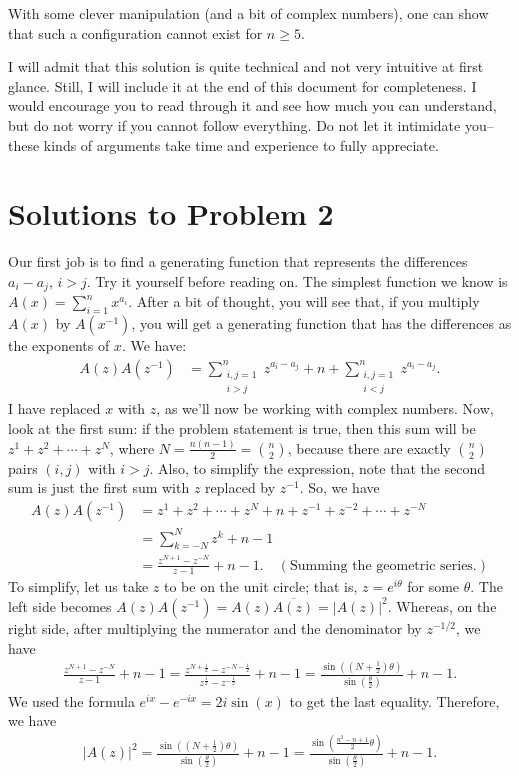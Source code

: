 \documentclass[11pt]{scrartcl}
\theoremstyle{plain}
\theoremstyle{definition}
\theoremstyle{remark}
\newcounter{problem}
\newcounter{solution}
\begin{document}
With some clever manipulation (and a bit of complex numbers), one can show that such a configuration cannot exist for $n \geq 5$.

\bigskip

\noindent I will admit that this solution is quite technical and not very intuitive at first glance. Still, I will include it at the end of this document for completeness. I would encourage you to read through it and see how much you can understand, but do not worry if you cannot follow everything. Do not let it intimidate you--these kinds of arguments take time and experience to fully appreciate.

\section{Solutions to Problem 2}
Our first job is to find a generating function that represents the differences $a_i - a_j$, $i > j$. Try it yourself before reading on. The simplest function we know is $A(x) = \sum_{i=1}^{n} x^{a_i}$. After a bit of thought, you will see that, if you multiply $A(x)$ by $A(x^{-1})$, you will get a generating function that has the differences as the exponents of $x$. We have:
\begin{align*}
    A(z)A(z^{-1}) &= \sum_{\substack{i, j = 1\\i > j}}^{n} z^{a_i - a_j} + n + \sum_{\substack{i, j = 1\\i < j}}^{n} z^{a_i - a_j}.
\end{align*}
I have replaced $x$ with $z$, as we'll now be working with complex numbers. Now, look at the first sum: if the problem statement is true, then this sum will be $z^1 + z^2 + \cdots + z^N$, where $N = \frac{n(n-1)}{2} = \binom{n}{2}$, because there are exactly $\binom{n}{2}$ pairs $(i, j)$ with $i > j$. Also, to simplify the expression, note that the second sum is just the first sum with $z$ replaced by $z^{-1}$. So, we have
\begin{align*}
    A(z)A(z^{-1}) &= z^1 + z^2 + \cdots + z^N + n + z^{-1} + z^{-2} + \cdots + z^{-N}\\
    &= \sum_{k = -N}^{N} z^k + n - 1\\
    &= \frac{z^{N+1} - z^{-N}}{z - 1} + n - 1. \quad (\text{Summing the geometric series.})
\end{align*}
To simplify, let us take $z$ to be on the unit circle; that is, $z = e^{i\theta}$ for some $\theta$. The left side becomes $A(z)A(z^{-1}) = A(z)\overline{A(z)} = |A(z)|^2$. Whereas, on the right side, after multiplying the numerator and the denominator by $z^{-1/2}$, we have
\begin{align*}
    \frac{z^{N+1} - z^{-N}}{z - 1} + n - 1 = \frac{z^{N+\frac{1}{2}} - z^{-N-\frac{1}{2}}}{z^{\frac{1}{2}} - z^{-\frac{1}{2}}} + n - 1 = \frac{\sin((N+\frac{1}{2})\theta)}{\sin(\frac{\theta}{2})} + n - 1.
\end{align*}
We used the formula $e^{ix} - e^{-ix} = 2i\sin(x)$ to get the last equality. Therefore, we have
\begin{align*}
    |A(z)|^2 = \frac{\sin((N+\frac{1}{2})\theta)}{\sin(\frac{\theta}{2})} + n - 1 = \frac{\sin(\frac{n^2-n+1}{2}\theta)}{\sin(\frac{\theta}{2})} + n - 1.
\end{align*}
\end{document}
